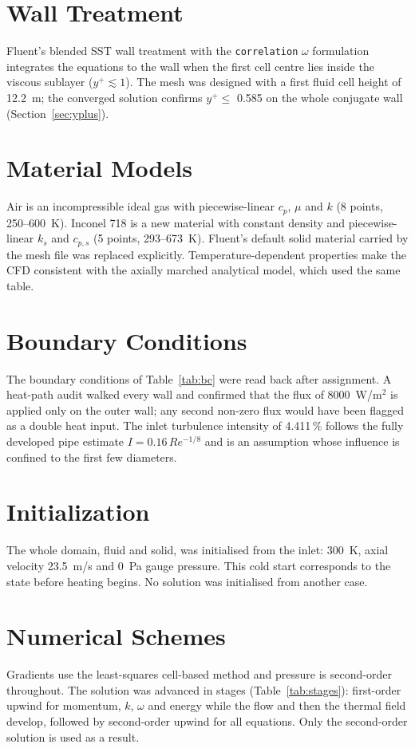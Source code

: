 \section{Wall Treatment}
Fluent's blended SST wall treatment with the \texttt{correlation} $\omega$ formulation integrates the equations to the wall when the first cell
centre lies inside the viscous sublayer ($y^+ \lesssim 1$). The mesh was designed with a first fluid cell height of 12.2~\textmu m; the
converged solution confirms $y^+ \le$ 0.585 on the whole conjugate wall (Section~\ref{sec:yplus}).

\section{Material Models}
Air is an incompressible ideal gas with piecewise-linear $c_p$, $\mu$ and $k$ (8 points, 250--600~K). Inconel 718 is a new material with
constant density and piecewise-linear $k_s$ and $c_{p,s}$ (5 points, 293--673~K). Fluent's default solid material carried by the mesh file
was replaced explicitly. Temperature-dependent properties make the CFD consistent with the axially marched analytical model, which used the
same table.

\section{Boundary Conditions}
The boundary conditions of Table~\ref{tab:bc} were read back after assignment. A heat-path audit walked every wall and confirmed that the
flux of 8000~W/m$^2$ is applied only on the outer wall; any second non-zero flux would have been flagged as a double heat input. The inlet
turbulence intensity of 4.411\,\% follows the fully developed pipe estimate $I = 0.16\,Re^{-1/8}$ and is an assumption whose influence is
confined to the first few diameters.

\section{Initialization}
The whole domain, fluid and solid, was initialised from the inlet: 300~K, axial velocity 23.5~m/s and 0~Pa gauge pressure. This cold
start corresponds to the state before heating begins. No solution was initialised from another case.

\section{Numerical Schemes}
Gradients use the least-squares cell-based method and pressure is second-order throughout. The solution was advanced in stages
(Table~\ref{tab:stages}): first-order upwind for momentum, $k$, $\omega$ and energy while the flow and then the thermal field develop, followed by
second-order upwind for all equations. Only the second-order solution is used as a result.

